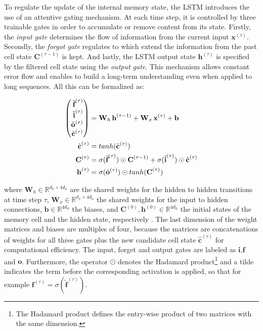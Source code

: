 To regulate the update of the internal memory state, the LSTM introduces the use of an attentive gating mechanism. At each time step, it is controlled by three trainable gates in order to accumulate or remove content from its state. Firstly, the \textit{input gate} determines the flow of information from the current input $ \textbf{x}^{(\tau)} $. Secondly, the \textit{forgot gate} regulates to which extend the information from the past cell state $\textbf{C}^{(\tau-1)}$ is kept. And lastly, the LSTM output state $\textbf{h}^{(\tau)}$ is specified by the filtered cell state using the \textit{output gate}. This mechanism allows constant error flow and enables to build a long-term understanding even when applied to long sequences. All this can be formalized as:

\begin{equation} \label{eq:lstm}
\begin{aligned}
\Spvek{\tilde{\textbf{f}}^{(\tau)}; \tilde{\textbf{i}}^{(\tau)}; \tilde{\textbf{o}}^{(\tau)}; \tilde{\textbf{c}}^{(\tau)}} &= \textbf{W}_{h} \, \textbf{h}^{(\tau-1)} + \textbf{W}_{x} \, \textbf{x}^{(\tau)} + \textbf{b} \\
\hat{\textbf{c}}^{(\tau)} &= tanh(\tilde{\textbf{c}}^{(\tau)}) \\
\textbf{C}^{(\tau)} &= \sigma(\tilde{\textbf{f}}^{(\tau)}) \odot \textbf{C}^{(\tau-1)} + \sigma(\tilde{\textbf{i}}^{(\tau)}) \odot \hat{\textbf{c}}^{(\tau)} \\
\textbf{h}^{(\tau)} &= \sigma(\tilde{\textbf{o}}^{(\tau)}) \odot tanh(\textbf{C}^{(\tau)})
\end{aligned}
\end{equation}

where $ \textbf{W}_h \in \mathbb{R}^{d_h \times 4d_h} $ are the shared weights for the hidden to hidden transitions at time step $ \tau $, $ \textbf{W}_x \in \mathbb{R}^{d_x \times 4d_h} $ the shared weights for the input to hidden connections, $ \textbf{b} \in \mathbb{R}^{4d_h} $ the biases, and $ \textbf{C}^{(0)}, \textbf{h}^{(0)} \in \mathbb{R}^{4d_h} $ the initial states of the memory cell and the hidden state, respectively \parencite{rnn-batchnorm}. The last dimension of the weight matrices and biases are multiples of four, because the matrices are concatenations of weights for all three gates plus the new candidate cell state $ \hat{\textbf{c}}^{(\tau)} $ for computational efficiency. The input, forget and output gates are labeled as $ \textbf{i}, \textbf{f} $ and $ \textbf{o} $. Furthermore, the operator $ \odot $ denotes the Hadamard product\footnote{The Hadamard product defines the entry-wise product of two matrices with the same dimension.} and a tilde indicates the term before the corresponding activation is applied, so that for example $ \textbf{f}^{(\tau)} = \sigma(\tilde{\textbf{f}}^{(\tau)}) $.


